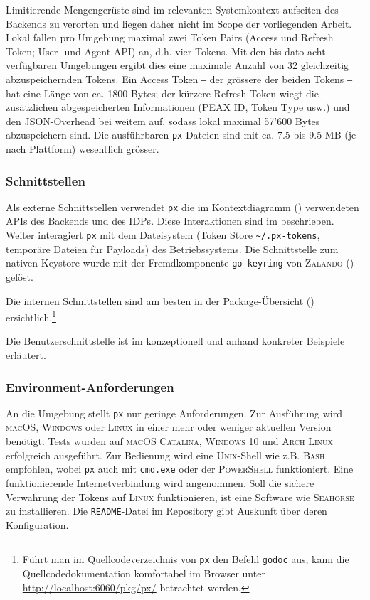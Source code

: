 Limitierende Mengengerüste sind im relevanten Systemkontext aufseiten des Backends zu verorten und liegen daher nicht im Scope der vorliegenden Arbeit. Lokal fallen pro Umgebung maximal zwei Token Pairs (Access und Refresh Token; User- und Agent-API) an, d.h. vier Tokens. Mit den bis dato acht verfügbaren Umgebungen ergibt dies eine maximale Anzahl von 32 gleichzeitig abzuspeichernden Tokens. Ein Access Token ‒ der grössere der beiden Tokens ‒ hat eine Länge von ca. 1800 Bytes; der kürzere Refresh Token wiegt die zusätzlichen abgespeicherten Informationen (PEAX ID, Token Type usw.) und den JSON-Overhead bei weitem auf, sodass lokal maximal 57'600 Bytes abzuspeichern sind. Die ausführbaren \texttt{px}-Dateien sind mit ca. 7.5 bis 9.5 MB (je nach Plattform) wesentlich grösser. 

\subsubsection{Schnittstellen}

Als externe Schnittstellen verwendet \texttt{px} die im Kontextdiagramm () verwendeten APIs des Backends und des IDPs. Diese Interaktionen sind im  beschrieben. Weiter interagiert \texttt{px} mit dem Dateisystem (Token Store \texttt{\~{}/.px-tokens}, temporäre Dateien für Payloads) des Betriebssystems. Die Schnittstelle zum nativen Keystore wurde mit der Fremdkomponente \texttt{go-keyring} von \textsc{Zalando} () gelöst.

Die internen Schnittstellen sind am besten in der Package-Übersicht () ersichtlich.\footnote{Führt man im Quellcodeverzeichnis von \texttt{px} den Befehl \texttt{godoc} aus, kann die Quellcodedokumentation komfortabel im Browser unter \url{http://localhost:6060/pkg/px/} betrachtet werden.}

Die Benutzerschnittstelle ist im  konzeptionell und anhand konkreter Beispiele erläutert. 

\subsubsection{Environment-Anforderungen}

An die Umgebung stellt \texttt{px} nur geringe Anforderungen. Zur Ausführung wird \textsc{macOS}, \textsc{Windows} oder \textsc{Linux} in einer mehr oder weniger aktuellen Version benötigt. Tests wurden auf \textsc{macOS Catalina}, \textsc{Windows 10} und \textsc{Arch Linux} erfolgreich ausgeführt. Zur Bedienung wird eine \textsc{Unix}-Shell wie z.B. \textsc{Bash} empfohlen, wobei \texttt{px} auch mit \texttt{cmd.exe} oder der \textsc{PowerShell} funktioniert. Eine funktionierende Internetverbindung wird angenommen. Soll die sichere Verwahrung der Tokens auf \textsc{Linux} funktionieren, ist eine Software wie \textsc{Seahorse} zu installieren. Die \texttt{README}-Datei im Repository gibt Auskunft über deren Konfiguration.

